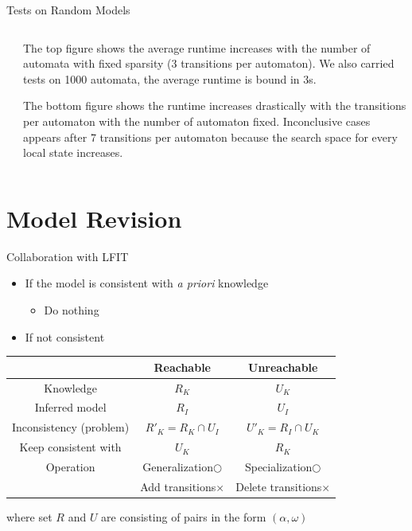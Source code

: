 \documentclass[8pt]{beamer}
\begin{document}
\begin{frame}{Tests on Random Models}
\begin{columns}
    \begin{column}{0.65\textwidth}
        
        
    \end{column}
    \begin{column}{0.35\textwidth}
        The top figure shows the average runtime increases with the number of automata with fixed sparsity (3 transitions per automaton). 
        We also carried tests on 1000 automata, the average runtime is bound in 3s. 
        
        \vspace{1cm}
        
        The bottom figure shows the runtime increases drastically with the transitions per automaton with the number of automaton fixed.
        Inconclusive cases appears after 7 transitions per automaton because the search space for every local state increases.
    \end{column}
\end{columns}
        
\end{frame}
\section{Model Revision}
\begin{frame}{Collaboration with LFIT}


\begin{itemize}
    \item If the model is consistent with \textit{a priori} knowledge
    \begin{itemize}
        \item Do nothing
    \end{itemize}
    \item If not consistent
    \end{itemize}
    \begin{table}[t]
        \centering
        \begin{tabular}{c|c|c}
            &Reachable &Unreachable\\
            \hline
            Knowledge& \multicolumn{1}{c}{$R_K$} & \multicolumn{1}{c}{$U_K$} \\
            \hline
            Inferred model& \multicolumn{1}{c}{$R_I$} & \multicolumn{1}{c}{$U_I$}\\
            \hline
            Inconsistency (problem)& $R'_K=R_K\cap U_I$ & $U'_K=R_I\cap U_K$\\
            Keep consistent with& $U_K$& $R_K$\\
            \hline
            Operation &Generalization$\bigcirc$ & Specialization$\bigcirc$\\
            &Add transitions$\times$&Delete transitions$\times$
        \end{tabular}
    \end{table}
    
    where set $R$ and $U$ are consisting of pairs in the form $(\alpha, \omega)$
\end{frame}
\end{document}
